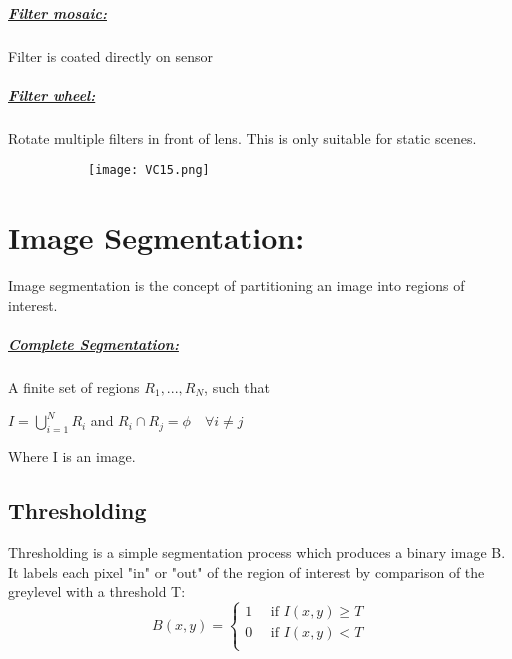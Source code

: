 \documentclass[8pt]{extreport}
\begin{document}
\paragraph{\underline{Filter mosaic:}} Filter is coated directly on sensor

\paragraph{\underline{Filter wheel:}} Rotate multiple filters in front of lens. This is only suitable for static scenes.
\begin{figure}[H]
\centering
\begin{subfigure}[b]{0.3\linewidth}
\texttt{[image: VC15.png]}
\end{subfigure}
\end{figure}

\chapter{Image Segmentation:}

Image segmentation is the concept of partitioning an image into regions of interest.

\paragraph{\underline{Complete Segmentation:}} A finite set of regions $R_1, ..., R_N$, such that
\begin{center}
$I = \bigcup\limits_{i=1}^{N}R_i$ and  $R_i \cap R_j = \phi \quad \forall i\neq j$
\end{center}
Where I is an image.

\section{Thresholding}

Thresholding is a simple segmentation process which produces a binary image B. It labels each pixel "in" or "out" of the region of interest by comparison of the greylevel with a threshold T:
\[ 
B(x,y) =
\begin{cases}
1 \quad \text{ if } I(x,y) \geq T\\
0 \quad \text{ if } I(x,y) < T\\
\end{cases}
\]
\end{document}

